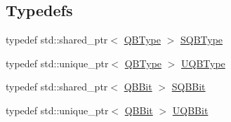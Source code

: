 \subsection*{Typedefs}
\begin{DoxyCompactItemize}
\item 
typedef std\+::shared\+\_\+ptr$<$ \hyperlink{classQuickMath_1_1QBType}{Q\+B\+Type} $>$ \hyperlink{namespaceQuickMath_ac7fba3fe1fa7904fe139bbe68de92923}{S\+Q\+B\+Type}
\item 
typedef std\+::unique\+\_\+ptr$<$ \hyperlink{classQuickMath_1_1QBType}{Q\+B\+Type} $>$ \hyperlink{namespaceQuickMath_af54af2708effd817452548da857ba076}{U\+Q\+B\+Type}
\item 
typedef std\+::shared\+\_\+ptr$<$ \hyperlink{classQuickMath_1_1QBBit}{Q\+B\+Bit} $>$ \hyperlink{namespaceQuickMath_a9d86d757cbfdd10689287a8f6d3f3b99}{S\+Q\+B\+Bit}
\item 
typedef std\+::unique\+\_\+ptr$<$ \hyperlink{classQuickMath_1_1QBBit}{Q\+B\+Bit} $>$ \hyperlink{namespaceQuickMath_a8bf3ddd5067daacf7c170b07a2fe79a1}{U\+Q\+B\+Bit}
\end{DoxyCompactItemize}
